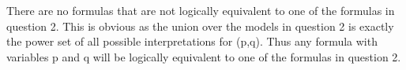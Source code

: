 There are no formulas that are not logically equivalent to one of the formulas in question 2. This is obvious as the union over the models in question 2 is exactly the power set of all possible interpretations for (p,q). Thus any formula with variables p and q will be logically equivalent to one of the formulas in question 2.